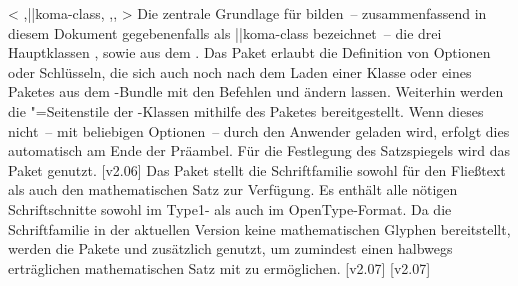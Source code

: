 \begin{DeclarePackages}
<%
    ,\Class||{koma-class},%
    ,,%
  >%
  Die zentrale Grundlage für \TUDScript bilden~-- zusammenfassend in diesem 
  Dokument gegebenenfalls als \Class||{koma-class} bezeichnet~-- die drei 
  Hauptklassen ,  sowie  aus dem 
  . Das Paket  erlaubt die 
  Definition von Optionen oder Schlüsseln, die sich auch noch nach dem Laden 
  einer Klasse oder eines Paketes aus dem \TUDScript-Bundle mit den Befehlen 
   und  ändern lassen. Weiterhin werden die 
  "=Seitenstile der \TUDScript-Klassen mithilfe des 
  Paketes  bereitgestellt. Wenn dieses nicht~-- mit 
  beliebigen Optionen~-- durch den Anwender geladen wird, erfolgt dies 
  automatisch am Ende der Präambel. Für die Festlegung des Satzspiegels wird
  das Paket  genutzt.
[v2.06]
  Das Paket  stellt die Schriftfamilie \OpenSans sowohl für 
  den Fließtext als auch den mathematischen Satz zur Verfügung. Es enthält alle 
  nötigen Schriftschnitte sowohl im Type1- als auch im OpenType-Format. Da die 
  Schriftfamilie in der aktuellen Version keine mathematischen Glyphen 
  bereitstellt, werden die Pakete  und  
  zusätzlich genutzt, um zumindest einen halbwegs erträglichen mathematischen 
  Satz mit \OpenSans zu ermöglichen.
  [v2.07]
  [v2.07]

\end{DeclarePackages}
